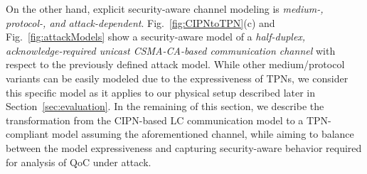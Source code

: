 {On the other hand, explicit security-aware channel modeling is \emph{medium-, protocol-, and attack-dependent}. Fig.~\ref{fig:CIPNtoTPN}(c) and Fig.~\ref{fig:attackModels} show a security-aware model of a \emph{half-duplex, acknowledge-required unicast CSMA-CA-based communication channel} with respect to the previously defined attack model. While other medium/protocol variants can be easily modeled due to the expressiveness of TPNs, we consider this specific model as it applies to our physical setup described later in Section~\ref{sec:evaluation}. In the remaining of this section, we describe the transformation from the CIPN-based LC communication model to a TPN-compliant model assuming the aforementioned channel, while aiming to balance between the model expressiveness and capturing security-aware behavior required for analysis of QoC under attack.
}





